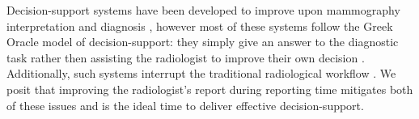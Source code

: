 Decision-support systems have been developed to improve upon mammography interpretation and diagnosis \cite{Garg:2005cb, Burnside:2000wl, ElizabethS:2005gc, Rubin:2005jg}, however most of these systems follow the Greek Oracle model of decision-support: they simply give an answer to the diagnostic task rather then assisting the radiologist to improve their own decision \cite{Miller:1990wg, Friedman:2009dx}. Additionally, such systems interrupt the traditional radiological workflow \cite{Morgan:2011ct}. We posit that improving the radiologist’s report during reporting time mitigates both of these issues and is the ideal time to deliver effective decision-support.